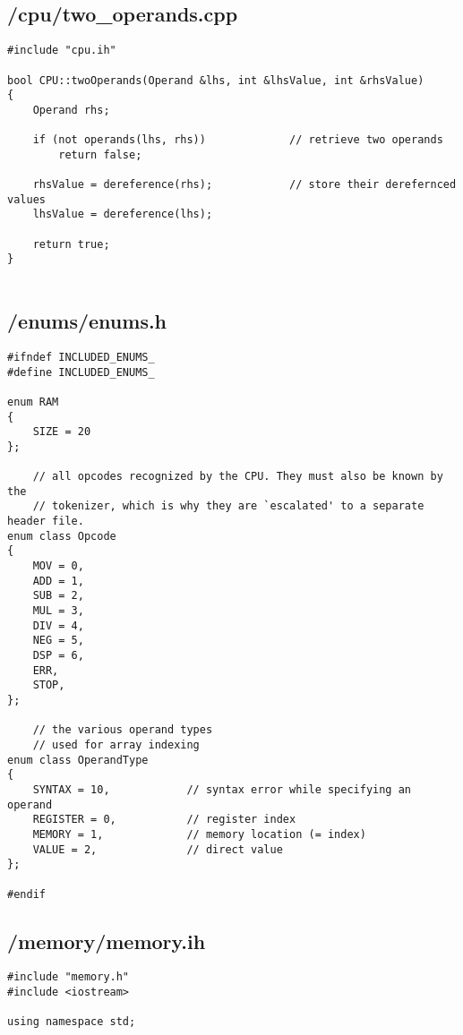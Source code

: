 \documentclass{article}
\begin{document}
\subsection*{/cpu/two\_operands.cpp}
\begin{verbatim}
#include "cpu.ih"

bool CPU::twoOperands(Operand &lhs, int &lhsValue, int &rhsValue)
{
    Operand rhs;

    if (not operands(lhs, rhs))             // retrieve two operands
        return false;

    rhsValue = dereference(rhs);            // store their derefernced values
    lhsValue = dereference(lhs);

    return true;
}


\end{verbatim}

\subsection*{/enums/enums.h}
\begin{verbatim}
#ifndef INCLUDED_ENUMS_
#define INCLUDED_ENUMS_

enum RAM
{
    SIZE = 20
};

    // all opcodes recognized by the CPU. They must also be known by the
    // tokenizer, which is why they are `escalated' to a separate header file.
enum class Opcode
{
    MOV = 0,
    ADD = 1,
    SUB = 2,
    MUL = 3,
    DIV = 4,
    NEG = 5,
    DSP = 6,
    ERR,
    STOP,
};

    // the various operand types
    // used for array indexing
enum class OperandType
{
    SYNTAX = 10,            // syntax error while specifying an operand
    REGISTER = 0,           // register index
    MEMORY = 1,             // memory location (= index)
    VALUE = 2,              // direct value
};

#endif

\end{verbatim}

\subsection*{/memory/memory.ih}
\begin{verbatim}
#include "memory.h"
#include <iostream>

using namespace std;

\end{verbatim}
\end{document}
